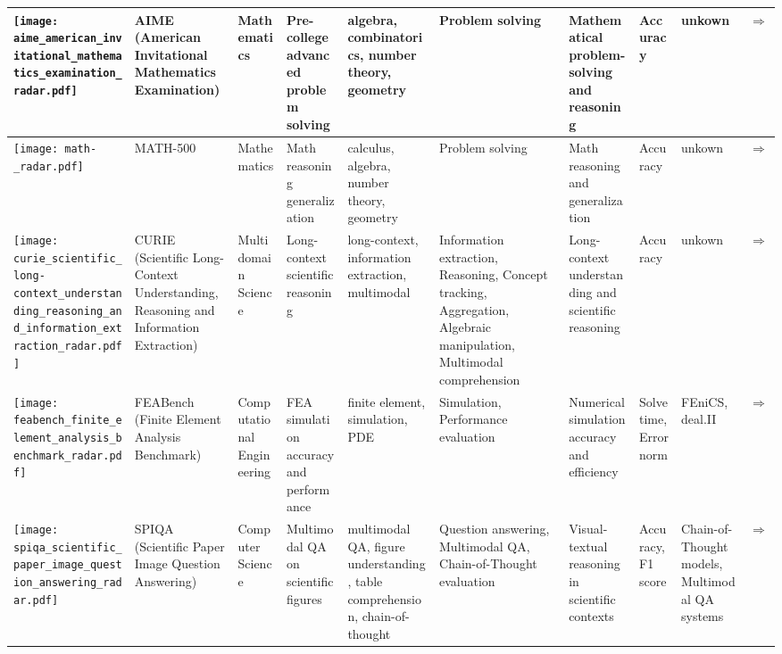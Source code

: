 \begin{landscape}
{\begin{longtable}{|p{}|p{}|p{}|p{}|p{}|p{}|p{}|p{}|p{}|p{}|}
\texttt{[image: aime\_american\_invitational\_mathematics\_examination\_radar.pdf]} & AIME (American Invitational Mathematics Examination) & Mathematics & Pre-college advanced problem solving & algebra, combinatorics, number theory, geometry & Problem solving & Mathematical problem-solving and reasoning & Accuracy & unkown & \cite{www-aime}\href{https://artofproblemsolving.com/wiki/index.php/AIME\_Problems\_and\_Solutions}{$\Rightarrow$} \\ \hline
\texttt{[image: math-\_radar.pdf]} & MATH-500 & Mathematics & Math reasoning generalization & calculus, algebra, number theory, geometry & Problem solving & Math reasoning and generalization & Accuracy & unkown & \cite{huggingface2025math500}\href{https://huggingface.co/datasets/HuggingFaceH4/MATH-500}{$\Rightarrow$} \\ \hline
\texttt{[image: curie\_scientific\_long-context\_understanding\_reasoning\_and\_information\_extraction\_radar.pdf]} & CURIE (Scientific Long-Context Understanding, Reasoning and Information Extraction) & Multidomain Science & Long-context scientific reasoning & long-context, information extraction, multimodal & Information extraction, Reasoning, Concept tracking, Aggregation, Algebraic manipulation, Multimodal comprehension & Long-context understanding and scientific reasoning & Accuracy & unkown & \cite{cui2025curieevaluatingllmsmultitask}\href{https://arxiv.org/abs/2503.13517}{$\Rightarrow$} \\ \hline
\texttt{[image: feabench\_finite\_element\_analysis\_benchmark\_radar.pdf]} & FEABench (Finite Element Analysis Benchmark) & Computational Engineering & FEA simulation accuracy and performance & finite element, simulation, PDE & Simulation, Performance evaluation & Numerical simulation accuracy and efficiency & Solve time, Error norm & FEniCS, deal.II & \cite{mudur2025feabenchevaluatinglanguagemodels}\href{https://github.com/google/feabench}{$\Rightarrow$} \\ \hline
\texttt{[image: spiqa\_scientific\_paper\_image\_question\_answering\_radar.pdf]} & SPIQA (Scientific Paper Image Question Answering) & Computer Science & Multimodal QA on scientific figures & multimodal QA, figure understanding, table comprehension, chain-of-thought & Question answering, Multimodal QA, Chain-of-Thought evaluation & Visual-textual reasoning in scientific contexts & Accuracy, F1 score & Chain-of-Thought models, Multimodal QA systems & \cite{zhong2024spiqa}\href{https://arxiv.org/abs/2407.09413}{$\Rightarrow$} \\ \hline

\end{longtable}}
\end{landscape}
